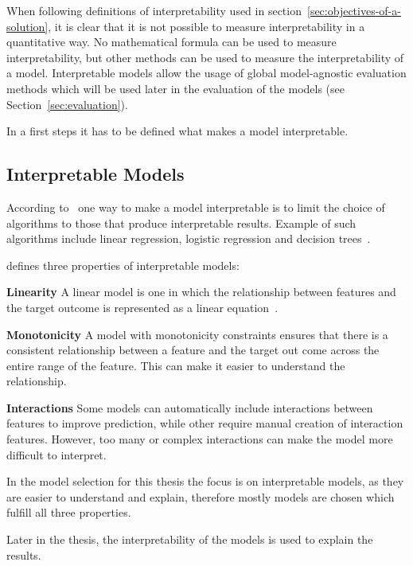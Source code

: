 

When following definitions of interpretability used in section~\ref{sec:objectives-of-a-
solution}, it is clear that it
is not possible to
measure interpretability in a quantitative way.
No mathematical formula can be used to measure interpretability, but other
methods can be used to
measure the interpretability of a model.
Interpretable models allow the usage of global model-agnostic evaluation
methods which will be
used later in the evaluation of the models (see Section~\ref{sec:evaluation}).

In a first steps it has to be defined what makes a model interpretable.

\subsection*{Interpretable Models}
According to~\cite{molnar2020interpretable} one way to make a model
interpretable is to limit the
choice of algorithms to those that produce interpretable results. Example of
such
algorithms include linear regression, logistic regression and decision
trees~\cite[p.
35]{molnar2020interpretable}.

\cite{molnar2020interpretable} defines three properties of interpretable models:

\textbf{Linearity} A linear model is one in which the relationship between
features and the
target outcome is represented as a linear
equation~\cite[]{molnar2020interpretable}.

\textbf{Monotonicity} A model with monotonicity constraints ensures that
there is a consistent
relationship between a feature and the target out come across the entire
range of the feature.
This can make it easier to understand the relationship.

\textbf{Interactions} Some models can automatically include
interactions between features to improve prediction, while other require
manual creation of
interaction features.
However, too many or complex interactions can make the model more
difficult to interpret.

In the model selection for this thesis the focus is on interpretable models,
as they are easier to
understand and explain, therefore mostly models are chosen which fulfill all
three
properties.

Later in the thesis, the interpretability of the models is used to explain
the results.

